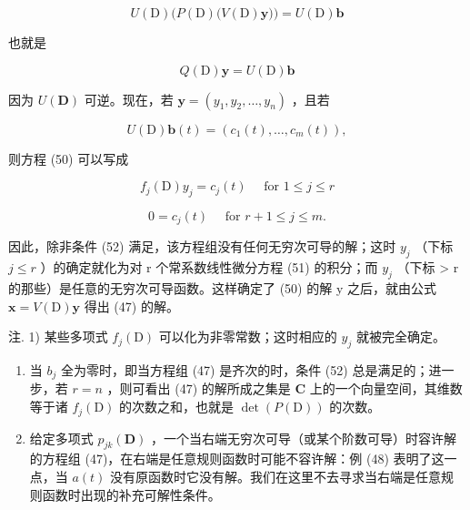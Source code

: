 \[
U (\mathrm{D}) \big (P (\mathrm{D}) \big (V (\mathrm{D}) \mathbf {y} \big) \big) = U (\mathrm{D}) \mathbf {b}
\]

也就是

\[
Q (\mathrm{D}) \mathbf {y} = U (\mathrm{D}) \mathbf {b}\tag{50}
\]

因为 \(U(\mathbf{D})\) 可逆。现在，若 \(\mathbf{y} = (y_1, y_2, \ldots, y_n)\) ，且若

\[
U (\mathrm{D}) \mathbf {b} (t) = \left(c _ {1} (t), \dots , c _ {m} (t)\right),
\]

则方程 (50) 可以写成

\[
f _ {j} (\mathrm{D}) y _ {j} = c _ {j} (t) \quad \text {   for   } 1 \leqslant j \leqslant r\tag{51}
\]

\[
0 = c _ {j} (t) \quad \text {   for   } r + 1 \leqslant j \leqslant m.\tag{52}
\]

因此，除非条件 (52) 满足，该方程组没有任何无穷次可导的解；这时 \(y_{j}\) （下标 \(j \leqslant r\) ）的确定就化为对 r 个常系数线性微分方程 (51) 的积分；而 \(y_{j}\) （下标 \textgreater{} r 的那些）是任意的无穷次可导函数。这样确定了 (50) 的解 y 之后，就由公式 \(\mathbf{x} = V(\mathrm{D})\mathbf{y}\) 得出 (47) 的解。

注. 1) 某些多项式 \(f_{j}(\mathrm{D})\) 可以化为非零常数；这时相应的 \(y_{j}\) 就被完全确定。

\begin{enumerate}
\def\labelenumi{\arabic{enumi})}
\setcounter{enumi}{1}
\item
  当 \(b_{j}\) 全为零时，即当方程组 (47) 是齐次的时，条件 (52) 总是满足的；进一步，若 \(r = n\) ，则可看出 (47) 的解所成之集是 \(\mathbf{C}\) 上的一个向量空间，其维数等于诸 \(f_{j}(\mathrm{D})\) 的次数之和，也就是 \(\det(P(\mathrm{D}))\) 的次数。
\item
  给定多项式 \(p_{jk}(\mathbf{D})\) ，一个当右端无穷次可导（或某个阶数可导）时容许解的方程组 (47)，在右端是任意规则函数时可能不容许解：例 (48) 表明了这一点，当 \(a(t)\) 没有原函数时它没有解。我们在这里不去寻求当右端是任意规则函数时出现的补充可解性条件。
\end{enumerate}

\setcounter{exercisegroup}{0}
